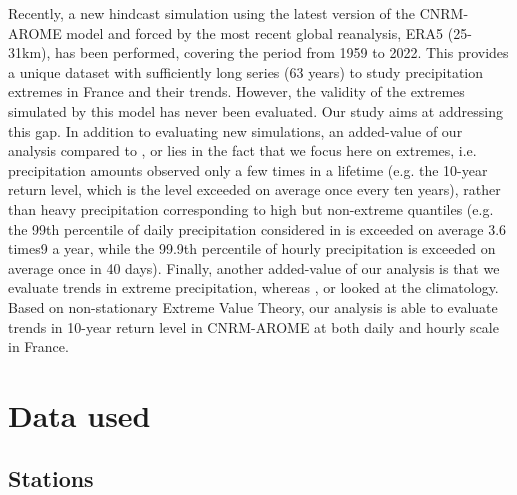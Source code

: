 \documentclass[french,a4paper,DIV=11,numbers=noendperiod]{scrartcl}
\begin{document}
Recently, a new hindcast simulation using the latest version of the CNRM-AROME model and forced by the most recent global reanalysis, ERA5 (25-31km), has been performed, covering the period from 1959 to 2022. This provides a unique dataset with sufficiently long series (63 years) to study precipitation extremes in France and their trends. However, the validity of the extremes simulated by this model has never been evaluated. Our study
aims at addressing this gap. 
 In addition to evaluating new simulations, an added-value of our analysis compared to \cite{Caillaud2021}, \cite{ban-etal-2021} or \cite{pichelli-etal-2021} lies in the fact that we focus here on extremes, i.e. precipitation amounts observed only a few times in a lifetime (e.g. the 10-year return level, which is the level exceeded on average once every ten years), rather than heavy precipitation corresponding to high but non-extreme quantiles (e.g. the 99th percentile of daily precipitation considered in \cite{ban-etal-2021} is exceeded on average 3.6 times9 a year, while the 99.9th percentile of hourly precipitation is exceeded on average once in 40 days). Finally, another added-value of our analysis is that we evaluate trends in extreme precipitation, whereas \cite{Caillaud2021}, \cite{ban-etal-2021} or \cite{pichelli-etal-2021}  looked at the climatology. Based on non-stationary Extreme Value Theory, our analysis is able to evaluate trends in 10-year return level in CNRM-AROME at both daily and hourly scale in France.


\section{Data used}\label{data-used}

\subsection{Stations}\label{stations}
\end{document}
